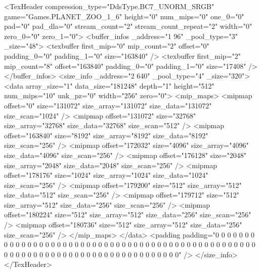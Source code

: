 <TexHeader compression_type="DdsType.BC7_UNORM_SRGB" game="Games.PLANET_ZOO_1_6" height="0" num_mips="0" one_0="0" pad="0" pad_dla="0" stream_count="2" stream_count_repeat="2" width="0" zero_0="0" zero_1="0">
	<buffer_infos _address="1 96" _pool_type="3" _size="48">
		<texbuffer first_mip="0" mip_count="2" offset="0" padding_0="0" padding_1="0" size="163840" />
		<texbuffer first_mip="2" mip_count="8" offset="163840" padding_0="0" padding_1="0" size="17408" />
	</buffer_infos>
	<size_info _address="2 640" _pool_type="4" _size="320">
		<data array_size="1" data_size="181248" depth="1" height="512" num_mips="10" unk_pz="0" width="256" zero="0">
			<mip_maps>
				<mipmap offset="0" size="131072" size_array="131072" size_data="131072" size_scan="1024" />
				<mipmap offset="131072" size="32768" size_array="32768" size_data="32768" size_scan="512" />
				<mipmap offset="163840" size="8192" size_array="8192" size_data="8192" size_scan="256" />
				<mipmap offset="172032" size="4096" size_array="4096" size_data="4096" size_scan="256" />
				<mipmap offset="176128" size="2048" size_array="2048" size_data="2048" size_scan="256" />
				<mipmap offset="178176" size="1024" size_array="1024" size_data="1024" size_scan="256" />
				<mipmap offset="179200" size="512" size_array="512" size_data="512" size_scan="256" />
				<mipmap offset="179712" size="512" size_array="512" size_data="256" size_scan="256" />
				<mipmap offset="180224" size="512" size_array="512" size_data="256" size_scan="256" />
				<mipmap offset="180736" size="512" size_array="512" size_data="256" size_scan="256" />
			</mip_maps>
		</data>
		<padding padding="0 0 0 0 0 0 0 0 0 0 0 0 0 0 0 0 0 0 0 0 0 0 0 0 0 0 0 0 0 0 0 0 0 0 0 0 0 0 0 0 0 0 0 0 0 0 0 0 0 0 0 0 0 0 0 0 0 0 0 0 0 0 0 0 0 0 0 0 0 0 0 0 0 0 0 0 0 0 0 0" />
	</size_info>
</TexHeader>
